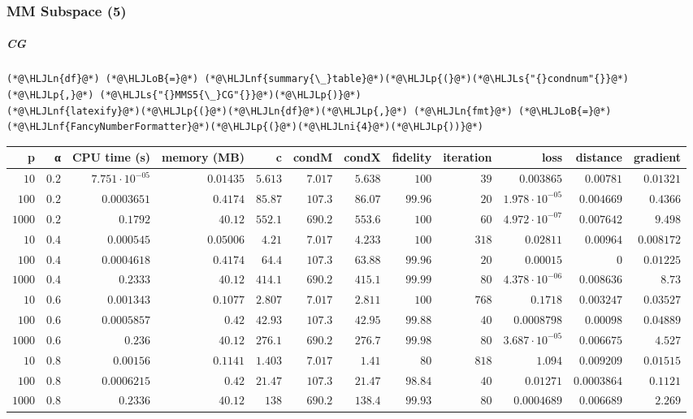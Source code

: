 \documentclass[12pt,a4paper]{article}
\newcommand{\HLJLn}[1]{#1}
\newcommand{\HLJLnf}[1]{\textcolor[RGB]{66,102,213}{#1}}
\newcommand{\HLJLs}[1]{\textcolor[RGB]{201,61,57}{#1}}
\newcommand{\HLJLni}[1]{\textcolor[RGB]{59,151,46}{#1}}
\newcommand{\HLJLoB}[1]{\textcolor[RGB]{102,102,102}{\textbf{#1}}}
\newcommand{\HLJLp}[1]{#1}
\begin{document}
\subsubsection{MM Subspace (5)}
\subparagraph{CG}

\begin{lstlisting}
(*@\HLJLn{df}@*) (*@\HLJLoB{=}@*) (*@\HLJLnf{summary{\_}table}@*)(*@\HLJLp{(}@*)(*@\HLJLs{"{}condnum"{}}@*)(*@\HLJLp{,}@*) (*@\HLJLs{"{}MMS5{\_}CG"{}}@*)(*@\HLJLp{)}@*)
(*@\HLJLnf{latexify}@*)(*@\HLJLp{(}@*)(*@\HLJLn{df}@*)(*@\HLJLp{,}@*) (*@\HLJLn{fmt}@*) (*@\HLJLoB{=}@*) (*@\HLJLnf{FancyNumberFormatter}@*)(*@\HLJLp{(}@*)(*@\HLJLni{4}@*)(*@\HLJLp{))}@*)
\end{lstlisting}


\begin{tabular}
{r | r | r | r | r | r | r | r | r | r | r | r}
p & α & CPU time (s) & memory (MB) & c & condM & condX & fidelity & iteration & loss & distance & gradient \\
\hline
$10$ & $0.2$ & $7.751 \cdot 10^{-05}$ & $0.01435$ & $5.613$ & $7.017$ & $5.638$ & $100$ & $39$ & $0.003865$ & $0.00781$ & $0.01321$ \\
$100$ & $0.2$ & $0.0003651$ & $0.4174$ & $85.87$ & $107.3$ & $86.07$ & $99.96$ & $20$ & $1.978 \cdot 10^{-05}$ & $0.004669$ & $0.4366$ \\
$1000$ & $0.2$ & $0.1792$ & $40.12$ & $552.1$ & $690.2$ & $553.6$ & $100$ & $60$ & $4.972 \cdot 10^{-07}$ & $0.007642$ & $9.498$ \\
$10$ & $0.4$ & $0.000545$ & $0.05006$ & $4.21$ & $7.017$ & $4.233$ & $100$ & $318$ & $0.02811$ & $0.00964$ & $0.008172$ \\
$100$ & $0.4$ & $0.0004618$ & $0.4174$ & $64.4$ & $107.3$ & $63.88$ & $99.96$ & $20$ & $0.00015$ & $0$ & $0.01225$ \\
$1000$ & $0.4$ & $0.2333$ & $40.12$ & $414.1$ & $690.2$ & $415.1$ & $99.99$ & $80$ & $4.378 \cdot 10^{-06}$ & $0.008636$ & $8.73$ \\
$10$ & $0.6$ & $0.001343$ & $0.1077$ & $2.807$ & $7.017$ & $2.811$ & $100$ & $768$ & $0.1718$ & $0.003247$ & $0.03527$ \\
$100$ & $0.6$ & $0.0005857$ & $0.42$ & $42.93$ & $107.3$ & $42.95$ & $99.88$ & $40$ & $0.0008798$ & $0.00098$ & $0.04889$ \\
$1000$ & $0.6$ & $0.236$ & $40.12$ & $276.1$ & $690.2$ & $276.7$ & $99.98$ & $80$ & $3.687 \cdot 10^{-05}$ & $0.006675$ & $4.527$ \\
$10$ & $0.8$ & $0.00156$ & $0.1141$ & $1.403$ & $7.017$ & $1.41$ & $80$ & $818$ & $1.094$ & $0.009209$ & $0.01515$ \\
$100$ & $0.8$ & $0.0006215$ & $0.42$ & $21.47$ & $107.3$ & $21.47$ & $98.84$ & $40$ & $0.01271$ & $0.0003864$ & $0.1121$ \\
$1000$ & $0.8$ & $0.2336$ & $40.12$ & $138$ & $690.2$ & $138.4$ & $99.93$ & $80$ & $0.0004689$ & $0.006689$ & $2.269$ \\
\end{tabular}
\end{document}
